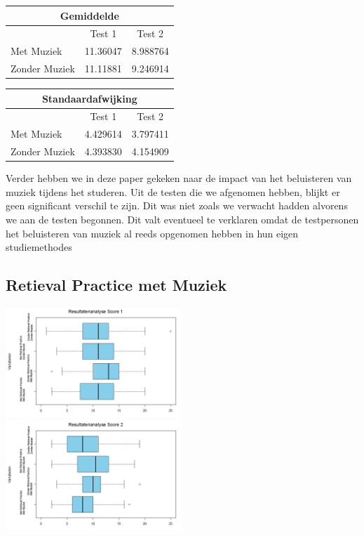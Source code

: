 \documentclass{hogent-article}
\begin{document}
	\begin{tabular}{ |p{10em}|c|c| }
	\hline
		\multicolumn{3}{|c|}{Gemiddelde} \\
	\hline
		& Test 1 & Test 2 \\
	\hline
		Met Muziek & 11.36047 & 8.988764 \\
		Zonder Muziek & 11.11881 & 9.246914 \\
	\hline
	\end{tabular}

	\begin{tabular}{ |p{10em}|c|c| }
	\hline
		\multicolumn{3}{|c|}{Standaardafwijking} \\
	\hline
		& Test 1 & Test 2 \\
	\hline
		Met Muziek & 4.429614 & 3.797411 \\
		Zonder Muziek & 4.393830 & 4.154909 \\
	\hline
	\end{tabular}

	Verder hebben we in deze paper gekeken naar de impact van het beluisteren van muziek tijdens het studeren. Uit de testen die we afgenomen hebben, blijkt er geen significant verschil te zijn. Dit was niet zoals we verwacht hadden alvorens we aan de testen begonnen. Dit valt eventueel te verklaren omdat de testpersonen het beluisteren van muziek al reeds opgenomen hebben in hun eigen studiemethodes
	
	\subsection{Retieval Practice met Muziek}
	\includegraphics[width=250px]{Final_boxplots_Score1}
	\includegraphics[width=250px]{Final_boxplots_Score2}
	
\end{document}
